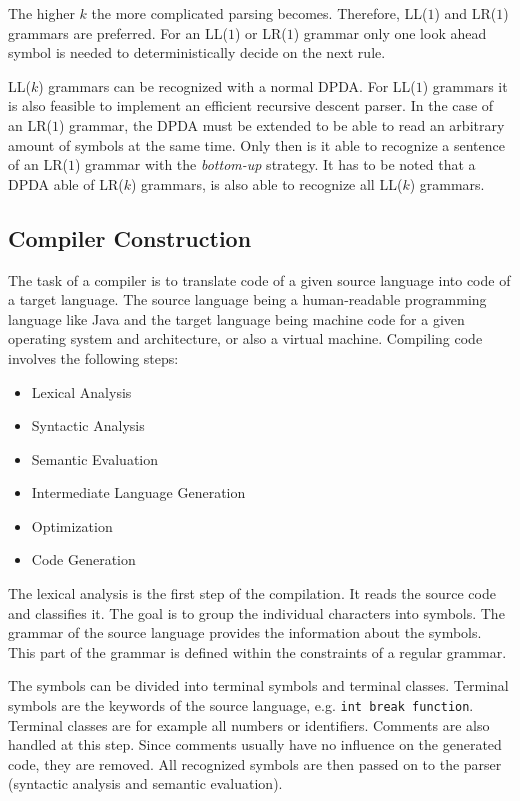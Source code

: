The higher $k$ the more complicated parsing becomes. Therefore, LL($1$) and LR($1$) grammars are preferred. For an LL($1$) or LR($1$) grammar only one look ahead symbol is needed to deterministically decide on the next rule. 

LL($k$) grammars can be recognized with a normal DPDA. For LL($1$) grammars it is also feasible to implement an efficient recursive descent parser. In the case of an LR($1$) grammar, the DPDA must be extended to be able to read an arbitrary amount of symbols at the same time. Only then is it able to recognize a sentence of an LR($1$) grammar with the \textit{bottom-up} strategy. It has to be noted that a DPDA able of LR($k$) grammars, is also able to recognize all LL($k$) grammars.

\subsection{Compiler Construction}

The task of a compiler is to translate code of a given source language into code of a target language. The source language being a human-readable programming language like Java and the target language being machine code for a given operating system and architecture, or also a virtual machine. Compiling code involves the following steps: 
  
\begin{itemize}
    \item Lexical Analysis
    \item Syntactic Analysis
    \item Semantic Evaluation
    \item Intermediate Language Generation
    \item Optimization
    \item Code Generation
\end{itemize}


The lexical analysis is the first step of the compilation. It reads the source code and classifies it. The goal is to group the individual characters into symbols. The grammar of the source language provides the information about the symbols. This part of the grammar is defined within the constraints of a regular grammar. 

The symbols can be divided into terminal symbols and terminal classes. Terminal symbols are the keywords of the source language, e.g. \texttt{int break function}. Terminal classes are for example all numbers or identifiers. Comments are also handled at this step. Since comments usually have no influence on the generated code, they are removed. All recognized symbols are then passed on to the parser (syntactic analysis and semantic evaluation). 



